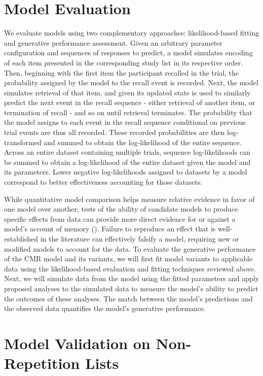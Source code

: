 \documentclass[
  man,
  floatsintext,
  longtable,
  nolmodern,
  notxfonts,
  notimes,
  draftfirst,
  colorlinks=true,linkcolor=blue,citecolor=blue,urlcolor=blue]{apa7}
\begin{document}
\section{Model Evaluation}\label{model-evaluation}

We evaluate models using two complementary approaches: likelihood-based
fitting and generative performance assessment. Given an arbitrary
parameter configuration and sequences of responses to predict, a model
simulates encoding of each item presented in the corresponding study
list in its respective order. Then, beginning with the first item the
participant recalled in the trial, the probability assigned by the model
to the recall event is recorded. Next, the model simulates retrieval of
that item, and given its updated state is used to similarly predict the
next event in the recall sequence - either retrieval of another item, or
termination of recall - and so on until retrieval terminates. The
probability that the model assigns to each event in the recall sequence
conditional on previous trial events are thus all recorded. These
recorded probabilities are then log-transformed and summed to obtain the
log-likelihood of the entire sequence. Across an entire dataset
containing multiple trials, sequence log-likelihoods can be summed to
obtain a log-likelihood of the entire dataset given the model and its
parameters. Lower negative log-likelihoods assigned to datasets by a
model correspond to better effectiveness accounting for those datasets.

While quantitative model comparison helps measure relative evidence in
favor of one model over another, tests of the ability of candidate
models to produce specific effects from data can provide more direct
evidence for or against a model's account of memory
().
Failure to reproduce an effect that is well-established in the
literature can effectively falsify a model, requiring new or modified
models to account for the data. To evaluate the generative performance
of the CMR model and its variants, we will first fit model variants to
applicable data using the likelihood-based evaluation and fitting
techniques reviewed above. Next, we will simulate data from the model
using the fitted parameters and apply proposed analyses to the simulated
data to measure the model's ability to predict the outcomes of these
analyses. The match between the model's predictions and the observed
data quantifies the model's generative performance.

\section{Model Validation on Non-Repetition
Lists}\label{model-validation-on-non-repetition-lists}
\end{document}
